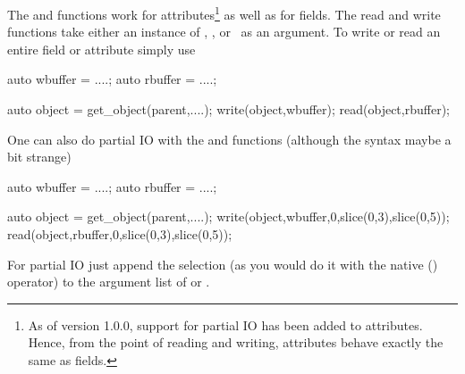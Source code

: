 The  and  functions work for attributes\footnote{As of
version 1.0.0, support for partial IO has been added to attributes. Hence, from
the point of reading and writing, attributes behave exactly the same as fields.}
as well as for fields. The read and write functions take either an instance of
\nxfield, \nxattribute, or \nxobject\ as an argument. To write or read an entire
field or attribute simply use
\begin{cppcode}
auto wbuffer = ....;
auto rbuffer = ....;

auto object = get_object(parent,....);
write(object,wbuffer);
read(object,rbuffer);
\end{cppcode}
One can also do partial IO with the  and  functions
(although the syntax maybe a bit strange)
\begin{cppcode}
auto wbuffer = ....;
auto rbuffer = ....;

auto object = get_object(parent,....);
write(object,wbuffer,0,slice(0,3),slice(0,5));
read(object,rbuffer,0,slice(0,3),slice(0,5));
\end{cppcode}
For partial IO just append the selection (as you would do it with the native ()
operator) to the argument list of  or .

